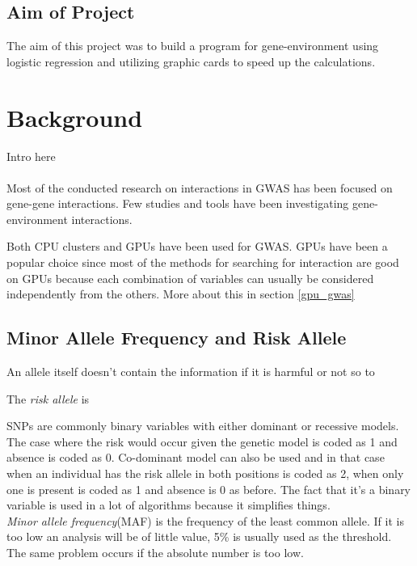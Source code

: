 \documentclass[10pt,a4paper]{report}
\begin{document}

\section{Aim of Project}
The aim of this project was to build a program for gene-environment using logistic regression and utilizing graphic cards to speed up the calculations.

\clearpage
\chapter{Background}
Intro here\\
\\
Most of the conducted research on interactions in GWAS has been focused on gene-gene interactions. Few studies and tools have been investigating gene-environment interactions.

Both CPU clusters\cite{biforce} and GPUs\cite{gwis,gboost,gmdr_gpu,cuda_lr,genie_2012,plink_gpu} have been used for GWAS. GPUs have been a popular choice since most of the methods for searching for interaction are good on GPUs because each combination of variables can usually be considered independently from the others. More about this in section \ref{gpu_gwas}


\section{Minor Allele Frequency and Risk Allele}
An allele itself doesn't contain the information if it is harmful or not so to

The \emph{risk allele} is


SNPs are commonly binary variables with either dominant or recessive models. The case where the risk would occur given the genetic model is coded as 1 and absence is coded as 0. Co-dominant model can also be used and in that case when an individual has the risk allele in both positions is coded as 2, when only one is present is coded as 1 and absence is 0 as before. The fact that it's a binary variable is used in a lot of algorithms because it simplifies things.\\



\emph{Minor allele frequency}(MAF) is the frequency of the least common allele. If it is too low an analysis will be of little value, 5\% is usually used as the threshold. The same problem occurs if the absolute number is too low.
\end{document}
